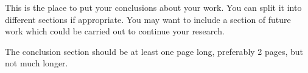 \documentclass[12pt,a4paper]{report}
\begin{document}
This is the place to put your conclusions about your work. You can
split it into different sections if appropriate. You may want to include
a section of future work which could be carried out to continue your
research.

The conclusion section should be at least one page long, preferably 2
pages, but not much longer.









\end{document}

